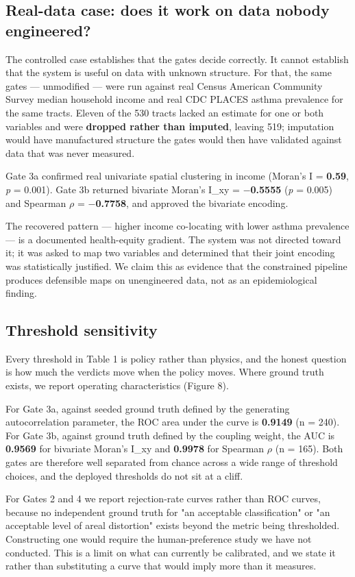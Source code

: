 \subsection{Real-data case: does it work on data nobody engineered?}
The controlled case establishes that the gates decide correctly. It cannot establish that the system is useful on data with unknown structure. For that, the same gates --- unmodified --- were run against real Census American Community Survey median household income and real CDC PLACES asthma prevalence for the same tracts. Eleven of the 530 tracts lacked an estimate for one or both variables and were \textbf{dropped rather than imputed}, leaving 519; imputation would have manufactured structure the gates would then have validated against data that was never measured.

Gate 3a confirmed real univariate spatial clustering in income (Moran's I = \textbf{0.59}, \emph{p} = 0.001). Gate 3b returned bivariate Moran's I\_xy = \textbf{$-$0.5555} (\emph{p} = 0.005) and Spearman $\rho$ = \textbf{$-$0.7758}, and approved the bivariate encoding.

The recovered pattern --- higher income co-locating with lower asthma prevalence --- is a documented health-equity gradient. The system was not directed toward it; it was asked to map two variables and determined that their joint encoding was statistically justified. We claim this as evidence that the constrained pipeline produces defensible maps on unengineered data, not as an epidemiological finding.

\subsection{Threshold sensitivity}
Every threshold in Table 1 is policy rather than physics, and the honest question is how much the verdicts move when the policy moves. Where ground truth exists, we report operating characteristics (Figure 8).

For Gate 3a, against seeded ground truth defined by the generating autocorrelation parameter, the ROC area under the curve is \textbf{0.9149} (n = 240). For Gate 3b, against ground truth defined by the coupling weight, the AUC is \textbf{0.9569} for bivariate Moran's I\_xy and \textbf{0.9978} for Spearman $\rho$ (n = 165). Both gates are therefore well separated from chance across a wide range of threshold choices, and the deployed thresholds do not sit at a cliff.

For Gates 2 and 4 we report rejection-rate curves rather than ROC curves, because no independent ground truth for "an acceptable classification" or "an acceptable level of areal distortion" exists beyond the metric being thresholded. Constructing one would require the human-preference study we have not conducted. This is a limit on what can currently be calibrated, and we state it rather than substituting a curve that would imply more than it measures.

